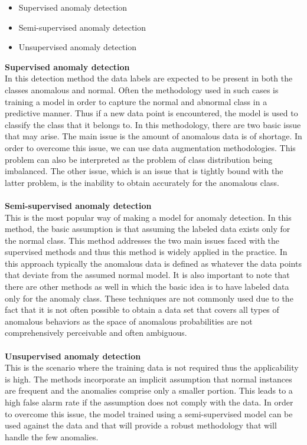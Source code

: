 \documentclass[a4paper,12pt]{report}
\begin{document}
\begin{itemize}
    \item Supervised anomaly detection
    \item Semi-supervised anomaly detection
    \item Unsupervised anomaly detection
\end{itemize}
\textbf{Supervised anomaly detection}\\
In this detection method the data labels are expected to be present in both the classes anomalous and normal. Often the methodology used in such cases is training a model in order to capture the normal and abnormal class in a predictive manner. Thus if a new data point is encountered, the model is used to classify the class that it belongs to.  In this methodology, there are two basic issue that may arise. The main issue is the amount of anomalous data is of shortage. In order to overcome this issue, we can use data augmentation methodologies. This problem can also be interpreted as the problem of class distribution being imbalanced. The other issue, which is an issue that is tightly bound with the latter problem, is the inability to obtain accurately for the anomalous class. 
\\\\
\textbf{Semi-supervised anomaly detection}\\
This is the most popular way of making a model for anomaly detection.  In this method, the basic assumption is that assuming the labeled data exists only for the normal class.  This method addresses the two main issues faced with the supervised methods and thus this method is widely applied in the practice.  In this approach typically the anomalous data is defined as whatever the data points that deviate from the assumed normal model. It is also important to note that there are other methods as well in which the basic idea is to have labeled data only for the anomaly class. These techniques are not commonly used due to the fact that it is not often possible to obtain a data set that covers all types of anomalous behaviors as the space of anomalous probabilities are not comprehensively perceivable and often ambiguous. 
\\\\
\textbf{Unsupervised anomaly detection}\\
This is the scenario where the training data is not required thus the applicability is high. The methods incorporate an implicit assumption that normal instances are frequent and the anomalies comprise only a smaller portion. This leads to a high false alarm rate if the assumption does not comply with the data.  In order to overcome this issue, the model trained using a semi-supervised model can be used against the data and that will provide a robust methodology that will handle the few anomalies. 
\end{document}
